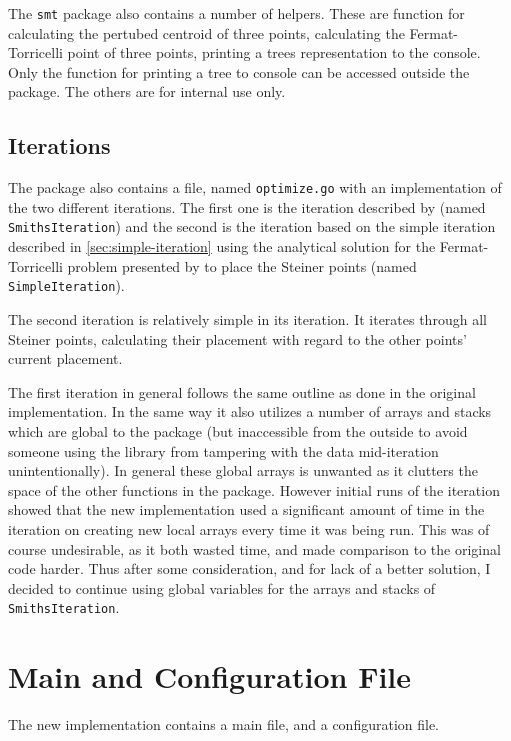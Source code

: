 The \texttt{smt} package also contains a number of helpers. These are function
for calculating the pertubed centroid of three points, calculating the
Fermat-Torricelli point of three points, printing a trees representation to the
console. Only the function for printing a tree to console can be accessed
outside the package. The others are for internal use only.

\subsection{Iterations}
\label{sec:iterations-1}

The package also contains a file, named \texttt{optimize.go} with an
implementation of the two different iterations. The first one is the iteration
described by \textcite{smith1992} (named \texttt{SmithsIteration}) and the
second is the iteration based on the simple iteration described in
\cref{sec:simple-iteration} using the analytical solution for the
Fermat-Torricelli problem presented by \textcite{uteshev2014} to place the
Steiner points (named \texttt{SimpleIteration}).

The second iteration is relatively simple in its iteration. It iterates
through all Steiner points, calculating their placement with regard to the
other points' current placement.

The first iteration in general follows the same outline as done in the original
implementation. In the same way it also utilizes a number of arrays and stacks
which are global to the package (but inaccessible from the outside to avoid
someone using the library from tampering with the data mid-iteration
unintentionally). In general these global arrays is unwanted as it clutters the
space of the other functions in the package. However initial runs of the
iteration showed that the new implementation used a significant amount of time
in the iteration on creating new local arrays every time it was being run. This
was of course undesirable, as it both wasted time, and made comparison to the
original code harder. Thus after some consideration, and for lack of a better
solution, I decided to continue using global variables for the arrays and stacks
of \texttt{SmithsIteration}.

\section{Main and Configuration File}
\label{sec:main-file}

The new implementation contains a main file, and a configuration file.

